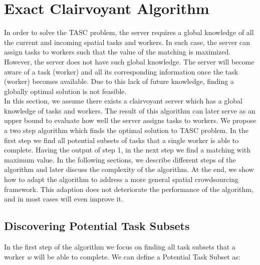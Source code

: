 \section{Exact Clairvoyant Algorithm}
\label{sec:exactalgo}

In order to solve the TASC problem, the server requires a global knowledge of all the current and incoming spatial tasks and workers. In such case, the server can assign tasks to workers such that the value of the matching is maximized. However, the server does not have such global knowledge. The server will become aware of a task (worker) and all its corresponding information once the task (worker) becomes available. Due to this lack of future knowledge, finding a globally optimal solution is not feasible.\\

In this section, we assume there exists a clairvoyant server which has a global knowledge of tasks and workers. The result of this algorithm can later serve as an upper bound to evaluate how well the server assigns tasks to workers. We propose a two step algorithm which finds the optimal solution to TASC problem. In the first step we find all potential subsets of tasks that a single worker is able to complete. Having the output of step 1, in the next step we find a matching with maximum value. In the following sections, we describe different steps of the algorithm and later discuss the complexity of the algorithm. At the end, we show how to adapt the algorithm to address a more general spatial crowdsourcing framework. This adaption does not deteriorate the performance of the algorithm, and in most cases will even improve it.

\subsection{Discovering Potential Task Subsets}
\label{subsec:FindPTS}
In the first step of the algorithm we focus on finding all task subsets that a worker \emph{w} will be able to complete. We can define a Potential Task Subset as:

